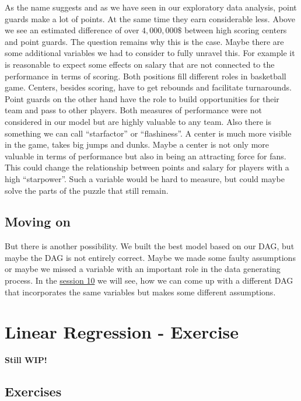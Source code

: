 \documentclass[
]{book}
\begin{document}
As the name suggests and as we have seen in our exploratory data analysis,
point guards make a lot of points. At the same time they earn considerable less.
Above we see an estimated difference of over \(4,000,000\$\) between high scoring
centers and point guards. The question remains why this is the case.
Maybe there are some additional variables we had to consider to fully unravel
this.
For example it is reasonable to expect some effects on salary that are not
connected to the performance in terms of scoring. Both positions fill different
roles in basketball game. Centers, besides scoring, have to get rebounds and
facilitate turnarounds. Point guards on the other hand have the role to build
opportunities for their team and pass to other players. Both measures of
performance were not considered in our model but are highly valuable to any team.
Also there is something we can call ``starfactor'' or ``flashiness''. A center is
much more visible in the game, takes big jumps and dunks. Maybe a center is not
only more valuable in terms of performance but also in being an attracting force
for fans. This could change the relationship between points and salary for
players with a high ``starpower''. Such a variable would be hard to measure,
but could maybe solve the parts of the puzzle that still remain.

\hypertarget{moving-on-3}{%
\section{Moving on}\label{moving-on-3}}

But there is another possibility. We built the best model based on our DAG, but
maybe the DAG is not entirely correct. Maybe we made some faulty assumptions or
maybe we missed a variable with an important role in the data generating
process. In the \protect\hyperlink{med}{session 10} we will see, how we can come up with a different
DAG that incorporates the same variables but makes some different assumptions.

\hypertarget{lin-e}{%
\chapter{Linear Regression - Exercise}\label{lin-e}}

\textbf{Still WIP!}

\hypertarget{exercises}{%
\section{Exercises}\label{exercises}}
\end{document}
